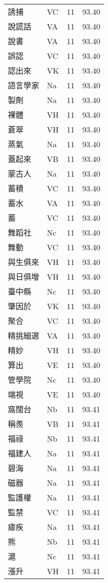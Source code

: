 \documentclass[twocolumn]{book}
\begin{document}
\begin{supertabular}{llrr}
誘捕 & VC & 11 &  93.40\\
說謊話 & VA & 11 &  93.40\\
說書 & VA & 11 &  93.40\\
誤認 & VC & 11 &  93.40\\
認出來 & VK & 11 &  93.40\\
語言學家 & Na & 11 &  93.40\\
製劑 & Na & 11 &  93.40\\
裸體 & VH & 11 &  93.40\\
蒼翠 & VH & 11 &  93.40\\
蒸氣 & Na & 11 &  93.40\\
蓋起來 & VB & 11 &  93.40\\
蒙古人 & Na & 11 &  93.40\\
蓄積 & VC & 11 &  93.40\\
蓄水 & VA & 11 &  93.40\\
蓄 & VC & 11 &  93.40\\
舞蹈社 & Nc & 11 &  93.40\\
舞動 & VC & 11 &  93.40\\
與生俱來 & VH & 11 &  93.40\\
與日俱增 & VH & 11 &  93.40\\
臺中縣 & Nc & 11 &  93.40\\
肇因於 & VK & 11 &  93.40\\
聚合 & VC & 11 &  93.40\\
精挑細選 & VA & 11 &  93.40\\
精妙 & VH & 11 &  93.40\\
算出 & VE & 11 &  93.40\\
管學院 & Nc & 11 &  93.40\\
端視 & VE & 11 &  93.40\\
窩闊台 & Nb & 11 &  93.41\\
稱羨 & VB & 11 &  93.41\\
福祿 & Nb & 11 &  93.41\\
福建人 & Na & 11 &  93.41\\
碧海 & Na & 11 &  93.41\\
磁器 & Na & 11 &  93.41\\
監護權 & Na & 11 &  93.41\\
監禁 & VC & 11 &  93.41\\
瘧疾 & Na & 11 &  93.41\\
熊 & Nb & 11 &  93.41\\
滬 & Nc & 11 &  93.41\\
漲升 & VH & 11 &  93.41\\

\end{supertabular}
\end{document}
